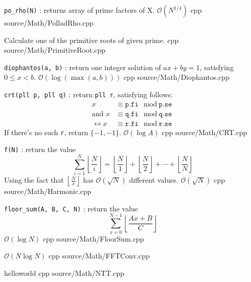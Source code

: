 \documentclass[landscape, 8pt, a4paper, oneside]{extarticle}
\begin{document}
\begin{multicols}{3}
{ \texttt{po\_rho(N)} : returns array of prime factors of X.}
{$\mathcal O (N^{1/4})$}
{cpp}
{source/Math/PolladRho.cpp}

{Calculate one of the primitive roots of given prime.}
{}{cpp}
{source/Math/PrimitiveRoot.cpp}

{\texttt{diophantos(a, b)} : return one integer solution of $ax+by=1$, satisfying $0 \le x < b$. }
{$\mathcal O \left(\log \left( \max(a, b) \right) \right)$}
{cpp}
{source/Math/Diophantos.cpp}

{\texttt{crt(pll p, pll q)} : return \texttt{pll r}, satisfying follows:
\begin{align*}
   x &\equiv \texttt{p.fi} \mod \texttt{p.se} \\
\text{and } x &\equiv \texttt{q.fi} \mod \texttt{q.se} \\
   \leftrightarrow x &\equiv \texttt{r.fi} \mod \texttt{r.se} 
\end{align*}
If there's no such \texttt{r}, return $\{-1, -1\}$.
}
{$\mathcal O(\log A)$}
{cpp}
{source/Math/CRT.cpp}

{\texttt{f(N)} : return the value 
$$\sum_{i=1}^{N} \left\lfloor \frac{N}{i} \right\rfloor = \left\lfloor \frac{N}{1}\right\rfloor + \left\lfloor \frac{N}{2} \right\rfloor + \cdots + \left\lfloor \frac{N}{N}\right\rfloor  $$
Using the fact that $\left\lfloor \frac{N}{x} \right\rfloor$ has $\mathcal O(\sqrt N)$ different values.}
{$\mathcal O(\sqrt N )$}
{cpp}
{source/Math/Harmonic.cpp}

{\texttt{floor\_sum(A, B, C, N)} : return the value 
$$\sum_{x=0}^{N-1} \left\lfloor  \frac{Ax+B}{C} \right\rfloor $$}
{$\mathcal O(\log N)$}
{cpp}
{source/Math/FloorSum.cpp}

{}
{$\mathcal O (N\log N)$}
{cpp}
{source/Math/FFTConv.cpp}



{helloworld}
{}
{cpp}
{source/Math/NTT.cpp}


\end{multicols}
\end{document}
